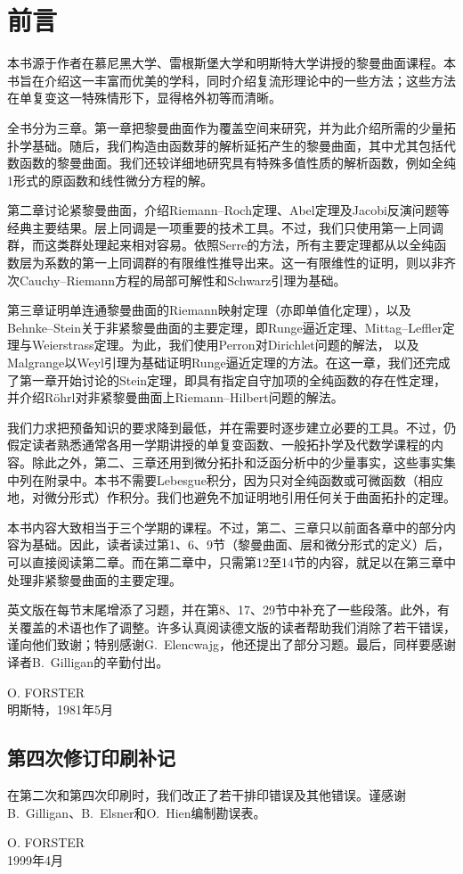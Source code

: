 \chapter*{前言}
本书源于作者在慕尼黑大学、雷根斯堡大学和明斯特大学讲授的黎曼曲面课程。本书旨在介绍这一丰富而优美的学科，同时介绍复流形理论中的一些方法；这些方法在单复变这一特殊情形下，显得格外初等而清晰。

全书分为三章。第一章把黎曼曲面作为覆盖空间来研究，并为此介绍所需的少量拓扑学基础。随后，我们构造由函数芽的解析延拓产生的黎曼曲面，其中尤其包括代数函数的黎曼曲面。我们还较详细地研究具有特殊多值性质的解析函数，例如全纯1形式的原函数和线性微分方程的解。

第二章讨论紧黎曼曲面，介绍Riemann--Roch定理、Abel定理及Jacobi反演问题等经典主要结果。层上同调是一项重要的技术工具。不过，我们只使用第一上同调群，而这类群处理起来相对容易。依照Serre的方法，所有主要定理都从以全纯函数层为系数的第一上同调群的有限维性推导出来。这一有限维性的证明，则以非齐次Cauchy--Riemann方程的局部可解性和Schwarz引理为基础。

第三章证明单连通黎曼曲面的Riemann映射定理（亦即单值化定理），以及Behnke--Stein关于非紧黎曼曲面的主要定理，即Runge逼近定理、Mittag--Leffler定理与Weierstrass定理。为此，我们使用Perron对Dirichlet问题的解法，
以及Malgrange以Weyl引理为基础证明Runge逼近定理的方法。在这一章，我们还完成了第一章开始讨论的Stein定理，即具有指定自守加项的全纯函数的存在性定理，并介绍Röhrl对非紧黎曼曲面上Riemann--Hilbert问题的解法。

我们力求把预备知识的要求降到最低，并在需要时逐步建立必要的工具。不过，仍假定读者熟悉通常各用一学期讲授的单复变函数、一般拓扑学及代数学课程的内容。除此之外，第二、三章还用到微分拓扑和泛函分析中的少量事实，这些事实集中列在附录中。本书不需要Lebesgue积分，因为只对全纯函数或可微函数（相应地，对微分形式）作积分。我们也避免不加证明地引用任何关于曲面拓扑的定理。

本书内容大致相当于三个学期的课程。不过，第二、三章只以前面各章中的部分内容为基础。因此，读者读过第1、6、9节（黎曼曲面、层和微分形式的定义）后，可以直接阅读第二章。而在第二章中，只需第12至14节的内容，就足以在第三章中处理非紧黎曼曲面的主要定理。

英文版在每节末尾增添了习题，并在第8、17、29节中补充了一些段落。此外，有关覆盖的术语也作了调整。许多认真阅读德文版的读者帮助我们消除了若干错误，谨向他们致谢；特别感谢G.~Elencwajg，他还提出了部分习题。最后，同样要感谢译者B.~Gilligan的辛勤付出。

\begin{flushright}O. FORSTER\\明斯特，1981年5月\end{flushright}
\section*{第四次修订印刷补记}
在第二次和第四次印刷时，我们改正了若干排印错误及其他错误。谨感谢B.~Gilligan、B.~Elsner和O.~Hien编制勘误表。
\begin{flushright}O. FORSTER\\1999年4月\end{flushright}
